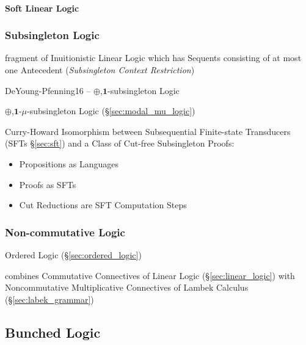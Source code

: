 \paragraph{Soft Linear Logic}\label{sec:soft_linear_logic}\hfill



\subsubsection{Subsingleton Logic}\label{sec:subsingleton_logic}

fragment of Inuitionistic Linear Logic which has Sequents consisting
of at most one Antecedent (\emph{Subsingleton Context Restriction})

DeYoung-Pfenning16 -- $\oplus$,$\mathbf{1}$-subsingleton Logic

\fist $\oplus$,$\mathbf{1}$-$\mu$-subsingleton Logic
(\S\ref{sec:modal_mu_logic})

Curry-Howard Isomorphism between Subsequential Finite-state
Transducers (SFTs \S\ref{sec:sft}) and a Class of Cut-free
Subsingleton Proofs:
\begin{itemize}
  \item Propositions as Languages
  \item Proofs as SFTs
  \item Cut Reductions are SFT Computation Steps
\end{itemize}



\subsubsection{Non-commutative Logic}\label{sec:noncommutative_logic}
\hfill

\fist Ordered Logic (\S\ref{sec:ordered_logic})

combines Commutative Connectives of Linear Logic
(\S\ref{sec:linear_logic}) with Noncommutative Multiplicative
Connectives of Lambek Calculus (\S\ref{sec:labek_grammar})



\subsection{Bunched Logic}\label{sec:bunched_logic}

\begingroup

